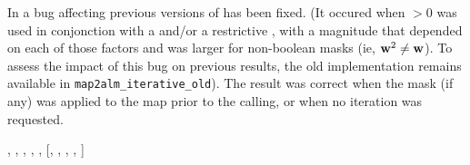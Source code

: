 \begin{facility}
{In  a bug affecting previous versions of \thedocid{} has been fixed.
(It occured when 
$>0$ 
was used in conjonction with a 
and/or a restrictive 
, 
with a magnitude that depended on each of those factors and was larger for non-boolean masks (ie, $\textbf{w}^2 \ne \textbf{w}$).
To assess the impact of this bug on previous results, the old implementation remains available in 
\texttt{map2alm\_iterative\_old}). 
The result was correct when the mask (if any) was applied to the map prior to the 
\thedocid{} calling, or when no iteration was requested.}
{\modAlmTools}
\end{facility}

\begin{f90format}
{%
, %
, %
, %
, %
, %
 [, %
, %
 ,
%
, %
]}
\end{f90format}

